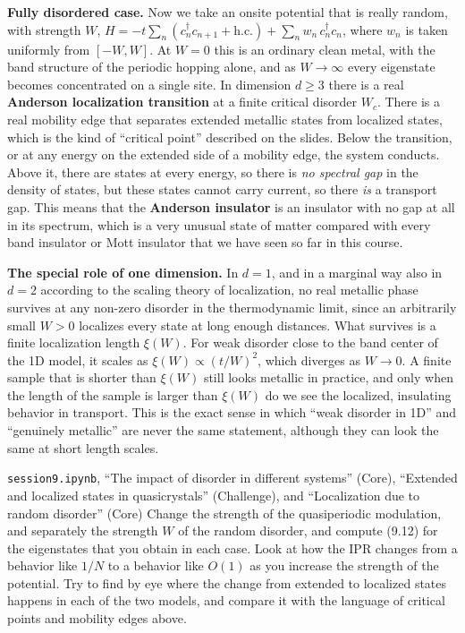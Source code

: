\textbf{Fully disordered case.} Now we take an onsite potential that is really random, with strength
$W$, $H = -t\sum_n (c_n^\dagger c_{n+1} + \text{h.c.}) + \sum_n w_n\, c_n^\dagger c_n$, where $w_n$ is
taken uniformly from $[-W,W]$. At $W=0$ this is an ordinary clean metal, with the band structure of
the periodic hopping alone, and as $W\to\infty$ every eigenstate becomes concentrated on a single
site. In dimension $d\geq 3$ there is a real \textbf{Anderson localization transition} at a finite
critical disorder $W_c$. There is a real mobility edge that separates extended metallic states from
localized states, which is the kind of ``critical point'' described on the slides. Below the
transition, or at any energy on the extended side of a mobility edge, the system conducts. Above it,
there are states at every energy, so there is \emph{no spectral gap} in the density of states, but
these states cannot carry current, so there \emph{is} a transport gap. This means that the
\textbf{Anderson insulator} is an insulator with no gap at all in its spectrum, which is a very
unusual state of matter compared with every band insulator or Mott insulator that we have seen so far
in this course.

\textbf{The special role of one dimension.} In $d=1$, and in a marginal way also in $d=2$ according to
the scaling theory of localization, no real metallic phase survives at any non-zero disorder in the
thermodynamic limit, since an arbitrarily small $W>0$ localizes every state at long enough distances.
What survives is a finite localization length $\xi(W)$. For weak disorder close to the band center of
the 1D model, it scales as $\xi(W) \propto (t/W)^2$, which diverges as $W\to 0$. A finite sample that
is shorter than $\xi(W)$ still looks metallic in practice, and only when the length of the sample is
larger than $\xi(W)$ do we see the localized, insulating behavior in transport. This is the exact
sense in which ``weak disorder in 1D'' and ``genuinely metallic'' are never the same statement,
although they can look the same at short length scales.

\begin{notebookbox}{\texttt{session9.ipynb}, ``The impact of disorder in different systems'' (Core), ``Extended and localized states in quasicrystals'' (Challenge), and ``Localization due to random disorder'' (Core)}
Change the strength of the quasiperiodic modulation, and separately the strength $W$ of the random
disorder, and compute (9.12) for the eigenstates that you obtain in each case. Look at how the
$\mathrm{IPR}$ changes from a behavior like $1/N$ to a behavior like $O(1)$ as you increase the
strength of the potential. Try to find by eye where the change from extended to localized states
happens in each of the two models, and compare it with the language of critical points and mobility
edges above.
\end{notebookbox}


